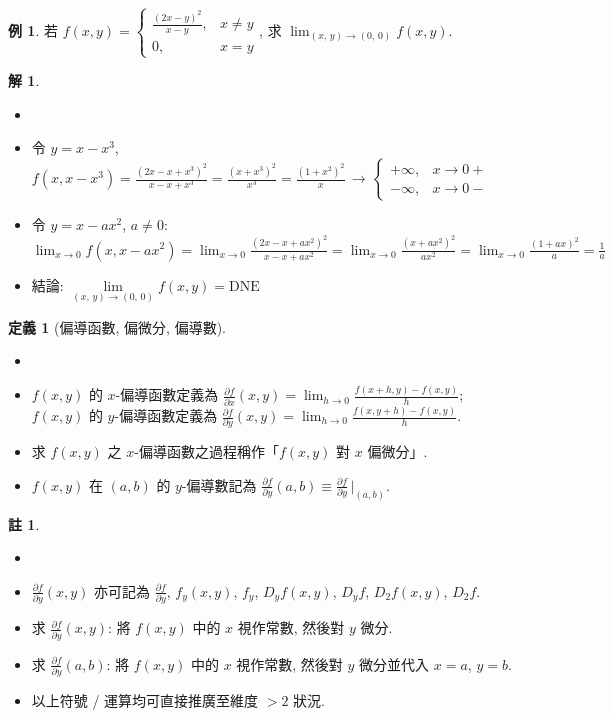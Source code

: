\documentclass[12pt]{extarticle}
\newcommand{\ds}{\displaystyle}
\theoremstyle{definition}
\newtheorem*{dfn}{定義}
\newtheorem*{ex}{例}
\newtheorem*{sol}{解}
\newtheorem*{rmk}{註}
\newcommand{\pdiff}[2]{\frac{\partial #1}{\partial #2}}
\begin{document}
\begin{ex}
  若 $\ds f(x,y) = \begin{cases}\frac{(2x-y)^2}{x-y}, & x\ne y\\0, & x = y\end{cases}$, 求 $\ds\lim_{(x,\,y)\to (0,\,0)} f(x,y)$. 
\end{ex}
\begin{sol}
  \begin{itemize}\setlength{\itemsep}{0pt}
    \item[]
    \item 令 $y = x - x^3$, $\ds f(x,x - x^3) = \frac{{(2 x - x + x^3)}^2}{x - x + x^3} = \frac{{(x + x^3)}^2}{x^3} = \frac{{(1 + x^2)}^2}{x}\,\longrightarrow\,\begin{cases}+\infty, & x\to 0+\\-\infty, & x\to 0-\end{cases}$
    \item 令 $y = x - ax^2$, $a\ne 0$: $\ds\lim_{x\to 0}f(x,x - a x^2) = \lim_{x\to 0}\frac{{(2x - x + a x^2)}^2}{x - x + a x^2} = \lim_{x\to 0}\frac{{(x + a x^2)}^2}{a x^2} = \lim_{x\to 0}\frac{{(1 + a x)}^2}{a} = \frac{1}{a}$
    \item 結論: $\ds\lim\limits_{(x,\,y)\to(0,\,0)}f(x,y) = \text{DNE}$
  \end{itemize}
\end{sol}

\begin{dfn}[偏導函數, 偏微分, 偏導數]
  \begin{itemize}\setlength{\itemsep}{0pt}
    \item[]
    \item $\ds f(x, y)$ 的 $x$-偏導函數定義為 $\ds\pdiff{f}{x}(x, y) = \lim_{h\to 0}\frac{f(x + h, y) - f(x, y)}{h}$; $\ds f(x, y)$ 的 $y$-偏導函數定義為 $\ds\pdiff{f}{y}(x,y) = \lim_{h\to 0}\frac{f(x, y + h) - f(x, y)}{h}$. 
    \item 求 $f(x, y)$ 之 $x$-偏導函數之過程稱作「$\ds f(x, y)$ 對 $x$ 偏微分」. 
    \item $\ds f(x, y)$ 在 $(a, b)$ 的 $y$-偏導數記為 $\ds\pdiff{f}{y}(a,b)\equiv\pdiff{f}{y}\,\bigg|_{(a,b)}$. 
  \end{itemize}
\end{dfn}
\begin{rmk}
  \begin{itemize}\setlength{\itemsep}{0pt}
    \item[]
    \item $\ds\pdiff{f}{y}(x,y)$ 亦可記為 $\ds\pdiff{f}{y}$, $\ds f_y(x,y)$, $\ds f_y$, $\ds D_yf(x,y)$, $\ds D_yf$, $D_2 f(x,y)$, $D_2 f$. 
    \item 求 $\ds\pdiff{f}{y}(x, y)$:  將 $f(x, y)$ 中的 $x$ 視作常數, 然後對 $y$ 微分. 
    \item 求 $\ds\pdiff{f}{y}(a, b)$:  將 $f(x, y)$ 中的 $x$ 視作常數, 然後對 $y$ 微分並代入 $x = a$, $y = b$. 
    \item 以上符號 / 運算均可直接推廣至維度 $> 2$ 狀況. 
  \end{itemize}
\end{rmk}
\end{document}
